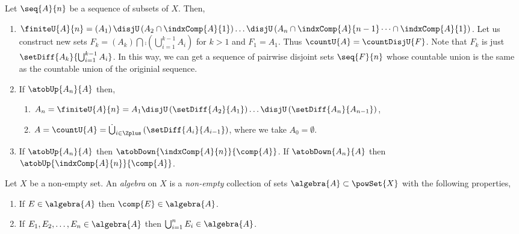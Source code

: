 \begin{Remark}\label{rmk:disjU}
    Let $\seq{A}{n}$ be a sequence of subsets of $X$. Then,
    \begin{enumerate}
	\item $\finiteU{A}{n} = \left(A_1\right) \disjU \left(A_2 \cap \indxComp{A}{1}\right)
	    \dots \disjU \left(A_n\cap\indxComp{A}{n-1}\dots\cap\indxComp{A}{1}\right)$. 
	    Let us construct new sets $F_k = (A_k) \bigcap \comp{(\bigcup_{i = 1}^{k-1}
		A_i)}$ for $k > 1$ and $F_1 = A_1$. Thus $\countU{A} = \countDisjU{F}$. Note that
	    $F_k$ is just $\setDiff{A_k}{\bigcup_{i = 1}^{k-1}A_i}$. In this way,
	    we can get a sequence of pairwise disjoint sets $\seq{F}{n}$ whose countable 
	    union is the same as the countable union of the originial sequence.
	\item If $\atobUp{A_n}{A}$ then, 
	    \begin{enumerate}
		\item $ A_n = \finiteU{A}{n} = A_1 \disjU \left(\setDiff{A_2}{A_1}\right) \dots \disjU
		    \left(\setDiff{A_n}{A_{n-1}}\right)$,
		\item $A = \countU{A} = \dot\bigcup_{i \in \Zplus}\left({\setDiff{A_i}{A_{i-1}}}\right)$, 
		    where we take $A_0 = \emptyset$.
	    \end{enumerate}
	\item If $\atobUp{A_n}{A}$ then $\atobDown{\indxComp{A}{n}}{\comp{A}}$. If
	    $\atobDown{A_n}{A}$ then $\atobUp{\indxComp{A}{n}}{\comp{A}}$.
	    
    \end{enumerate}
\end{Remark}

\begin{Definition}[name=Algebra of sets]
    Let $X$ be a non-empty set. An \emph{algebra} on $X$ is a \emph{non-empty} collection of sets
    $\algebra{A} \subset \powSet{X}$ with the following properties,
    \begin{enumerate}
	\item If $E \in \algebra{A}$ then $\comp{E} \in \algebra{A}$.
	\item If $E_1,E_2,\dots,E_n \in \algebra{A}$ then $\bigcup_{i=1}^{n}E_i \in \algebra{A}$.
    \end{enumerate} 
\end{Definition}


